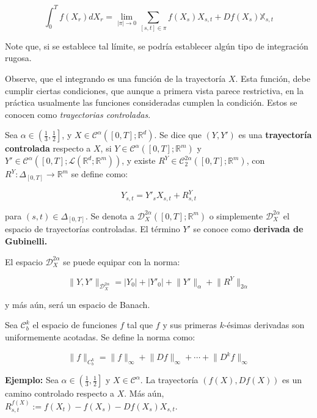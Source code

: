 \[
	\int_0^T f(X_r) dX_r = \lim_{ \lvert \pi \rvert \rightarrow 0 } \sum_{ [s,t] \in \pi } f(X_s) X_{s,t} + D f(X_s) \mathbb{X}_{s,t}
\]

Note que, si se establece tal límite, se podría establecer algún tipo de integración rugosa.

Observe, que el integrando es una función de la trayectoría $X$. Esta función, debe cumplir ciertas condiciones, que aunque a primera vista parece restrictiva, en la práctica usualmente las funciones consideradas cumplen la condición. Estos se conocen como \textit{trayectorias controladas}.

\begin{boxDef}
	Sea $\alpha \in \left( \frac{1}{3}, \frac{1}{2} \right]$, y $X \in \mathcal{C}^{\alpha}([0,T]; \mathbb{R}^d)$. Se dice que $(Y, Y')$ es una \textbf{trayectoría controlada} respecto a $X$, si $Y \in \mathcal{C}^{\alpha}([0,T]; \mathbb{R}^m)$ y $Y' \in \mathcal{C}^{\alpha}([0,T]; \mathcal{L}(\mathbb{R}^d; \mathbb{R}^m))$, y existe $R^Y \in \mathcal{C}^{2\alpha}_2 ([0,T]; \mathbb{R}^m)$, con $R^Y: \Delta_{[0,T]} \rightarrow \mathbb{R}^m$ se define como:

	\[
		Y_{s,t} = Y'_{s} X_{s,t} + R^Y_{s,t}	
	\]

	para $(s,t) \in \Delta_{[0,T]}$. Se denota a $\mathscr{D}_X^{2\alpha}([0,T];\mathbb{R}^m)$ o simplemente $\mathscr{D}_X^{2\alpha}$ el espacio de trayectorías controladas. El término $Y'$ se conoce como \textbf{derivada de Gubinelli.}

\end{boxDef}


El espacio $\mathscr{D}_X^{2\alpha}$ se puede equipar con la norma:

\[
	\lVert Y, Y' \rVert_{\mathscr{D}_X^{2\alpha}} = \lvert Y_0 \rvert + \lvert Y'_0 \rvert + \lVert Y' \rVert_{\alpha} + \lVert R^Y \rVert_{2\alpha}
\]

y más aún, será un espacio de Banach.


Sea $\mathcal{C}_b^k$ el espacio de funciones $f$ tal que $f$ y sus primeras $k$-ésimas derivadas son uniformemente acotadas. Se define la norma como:

\[
	\lVert f \rVert_{C_b^k} = \lVert f \rVert_{\infty} + \lVert D f \rVert_{\infty} + \cdots + \lVert D^k f \rVert_{\infty}
\]

\textbf{Ejemplo:} Sea $\alpha \in \left( \frac{1}{3}, \frac{1}{2}  \right]$ y $X \in \mathcal{C}^{\alpha}$. La trayectoría $(f(X), Df(X))$ es un camino controlado respecto a $X$. Más aún, $R^{f(X)}_{s,t} := f(X_t) - f(X_s) - Df(X_s) X_{s,t}$.


